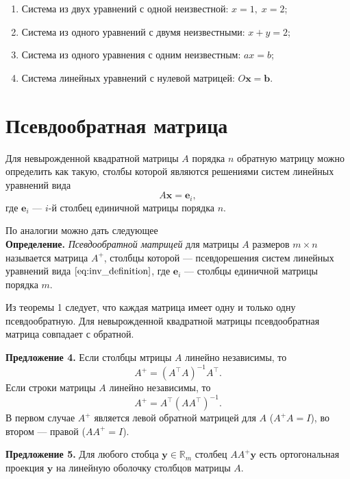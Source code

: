 \documentclass[11pt,a4paper]{article}
\providecommand{\tightlist}{%
      \setlength{\itemsep}{0pt}\setlength{\parskip}{0pt}}
\begin{document}
\begin{enumerate}
\def\labelenumi{\arabic{enumi}.}
\tightlist
\item
  Система из двух уравнений с одной неизвестной: \(x=1, \; x=2\);
\item
  Система из одного уравнений с двумя неизвестными: \(x + y = 2\);
\item
  Система из одного уравнения с одним неизвестным: \(ax=b\);
\item
  Система линейных уравнений с нулевой матрицей:
  \(O \mathbf{x} = \mathbf{b}\).
\end{enumerate}

    \hypertarget{ux43fux441ux435ux432ux434ux43eux43eux431ux440ux430ux442ux43dux430ux44f-ux43cux430ux442ux440ux438ux446ux430}{%
\section{Псевдообратная
матрица}\label{ux43fux441ux435ux432ux434ux43eux43eux431ux440ux430ux442ux43dux430ux44f-ux43cux430ux442ux440ux438ux446ux430}}

Для невырожденной квадратной матрицы \(A\) порядка \(n\) обратную
матрицу можно определить как такую, столбы которой являются решениями
систем линейных уравнений вида \[
  A\mathbf{x} = \mathbf{e}_i, \tag{2} \label{eq:inv_definition}
\] где \(\mathbf{e}_i\) --- \(i\)-й столбец единичной матрицы порядка
\(n\).

По аналогии можно дать следующее\\
\textbf{Определение.} \emph{Псевдообратной матрицей} для матрицы \(A\)
размеров \(m \times n\) называется матрица \(A^+\), столбцы которой ---
псевдорешения систем линейных уравнений вида
\(\eqref{eq:inv_definition}\), где \(\mathbf{e}_i\) --- столбцы
единичной матрицы порядка \(m\).

Из теоремы 1 следует, что каждая матрица имеет одну и только одну
псевдообратную. Для невырожденной квадратной матрицы псевдообратная
матрица совпадает с обратной.

\textbf{Предложение 4.} Если столбцы мтрицы \(A\) линейно независимы, то
\[
  A^+ = (A^\top A)^{-1} A^\top.
\] Если строки матрицы \(A\) линейно независимы, то \[
  A^+ = A^\top (A A^\top)^{-1}.
\] В первом случае \(A^+\) является левой обратной матрицей для \(A\)
(\(A^+A=I\)), во втором --- правой (\(A A^+ = I\)).

\textbf{Предложение 5.} Для любого стобца
\(\mathbf{y} \in \mathbb{R}_m\) столбец \(A A^+ \mathbf{y}\) есть
ортогональная проекция \(\mathbf{y}\) на линейную оболочку столбцов
матрицы \(A\).
\end{document}
